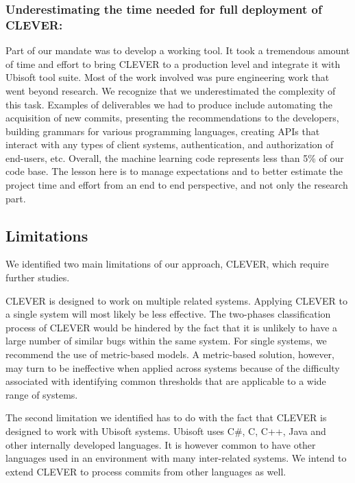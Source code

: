 \documentclass[sigconf]{acmart}
\begin{document}
\subsubsection{Underestimating the time needed for full deployment of CLEVER:}\label{underestimating-the-time-needed-for-full-deployment-of-clever}

Part of our mandate was to develop a working tool. It took a tremendous
amount of time and effort to bring CLEVER to a production level and
integrate it with Ubisoft tool suite. Most of the work involved was pure
engineering work that went beyond research. We recognize that we
underestimated the complexity of this task. Examples of deliverables we
had to produce include automating the acquisition of new commits,
presenting the recommendations to the developers, building grammars for
various programming languages, creating APIs that interact with any
types of client systems, authentication, and authorization of end-users,
etc. Overall, the machine learning code represents less than 5\% of our
code base. The lesson here is to manage expectations and to better
estimate the project time and effort from an end to end perspective, and
not only the research part.

\subsection{Limitations}\label{limitations}

We identified two main limitations of our approach, CLEVER, which
require further studies.

CLEVER is designed to work on multiple related systems. Applying CLEVER
to a single system will most likely be less effective. The two-phases
classification process of CLEVER would be hindered by the fact that it
is unlikely to have a large number of similar bugs within the same
system. For single systems, we recommend the use of metric-based models.
A metric-based solution, however, may turn to be ineffective when
applied across systems because of the difficulty associated with
identifying common thresholds that are applicable to a wide range of
systems.

The second limitation we identified has to do with the fact that CLEVER
is designed to work with Ubisoft systems. Ubisoft uses C\#, C, C++, Java
and other internally developed languages. It is however common to have
other languages used in an environment with many inter-related systems.
We intend to extend CLEVER to process commits from other languages as
well.
\end{document}
